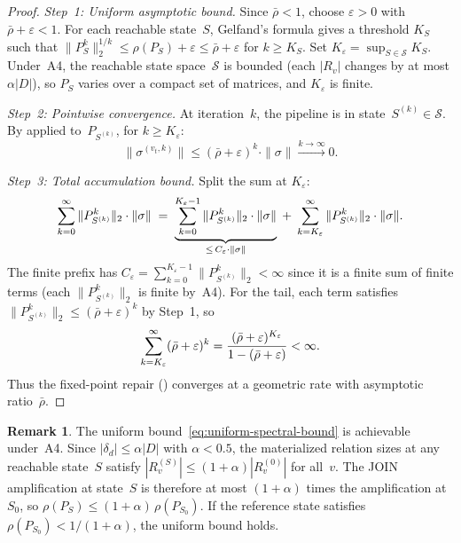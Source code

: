 \documentclass[11pt,a4paper]{article}
\theoremstyle{definition}
\newtheorem{remark}[theorem]{Remark}
\newcommand{\specnorm}[1]{\|#1\|_2}
\newcommand{\propmat}{P}
\newcommand{\propmatS}{\propmat_{S_0}}
\begin{document}
\begin{proof}
\emph{Step~1: Uniform asymptotic bound.}
Since $\bar{\rho} < 1$, choose $\varepsilon > 0$ with
$\bar{\rho} + \varepsilon < 1$.  For each reachable state~$S$,
Gelfand's formula gives a threshold $K_S$ such that
$\specnorm{\propmat_S^k}^{1/k} \leq \rho(\propmat_S) + \varepsilon
\leq \bar{\rho} + \varepsilon$ for $k \geq K_S$.
Set $K_\varepsilon = \sup_{S \in \mathcal{S}} K_S$.  Under~A4, the
reachable state space~$\mathcal{S}$ is bounded (each $|R_v|$ changes by
at most $\alpha|D|$), so $\propmat_S$ varies over a compact set of matrices,
and $K_\varepsilon$ is finite.

\emph{Step~2: Pointwise convergence.}
At iteration~$k$, the pipeline is in state~$S^{(k)} \in \mathcal{S}$.
By  applied to~$\propmat_{S^{(k)}}$, for $k \geq K_\varepsilon$:
\[
  \|\sigma^{(v_t, k)}\|
  \leq (\bar{\rho} + \varepsilon)^k \cdot \|\sigma\|
  \xrightarrow{k \to \infty} 0.
\]

\emph{Step~3: Total accumulation bound.}
Split the sum at $K_\varepsilon$:
\[
  \sum_{k=0}^{\infty} \specnorm{\propmat_{S^{(k)}}^k} \cdot \|\sigma\|
  \;=\;
  \underbrace{\sum_{k=0}^{K_\varepsilon - 1}
    \specnorm{\propmat_{S^{(k)}}^k} \cdot \|\sigma\|}_{%
      \leq\, C_\varepsilon \cdot \|\sigma\|}
  \;+\;
  \sum_{k=K_\varepsilon}^{\infty}
    \specnorm{\propmat_{S^{(k)}}^k} \cdot \|\sigma\|.
\]
The finite prefix has $C_\varepsilon = \sum_{k=0}^{K_\varepsilon - 1}
\specnorm{\propmat_{S^{(k)}}^k} < \infty$ since it is a finite sum of finite
terms (each $\specnorm{\propmat_{S^{(k)}}^k}$ is finite by~A4).
For the tail, each term satisfies
$\specnorm{\propmat_{S^{(k)}}^k} \leq (\bar{\rho} + \varepsilon)^k$
by Step~1, so
\[
  \sum_{k=K_\varepsilon}^{\infty} (\bar{\rho} + \varepsilon)^k
  = \frac{(\bar{\rho} + \varepsilon)^{K_\varepsilon}}{%
    1 - (\bar{\rho} + \varepsilon)} < \infty.
\]
Thus the fixed-point repair () converges at a geometric
rate with asymptotic ratio~$\bar{\rho}$.
\end{proof}

\begin{remark}
The uniform bound~\eqref{eq:uniform-spectral-bound} is achievable under~A4.
Since $|\delta_d| \leq \alpha|D|$ with $\alpha < 0.5$, the materialized
relation sizes at any reachable state~$S$ satisfy
$|R_v^{(S)}| \leq (1 + \alpha)|R_v^{(0)}|$ for all~$v$.  The JOIN
amplification at state~$S$ is therefore at most $(1+\alpha)$ times the
amplification at~$S_0$, so
$\rho(\propmat_S) \leq (1+\alpha) \,\rho(\propmatS)$.  If the reference
state satisfies $\rho(\propmatS) < 1/(1+\alpha)$, the uniform bound holds.
\end{remark}
\end{document}

